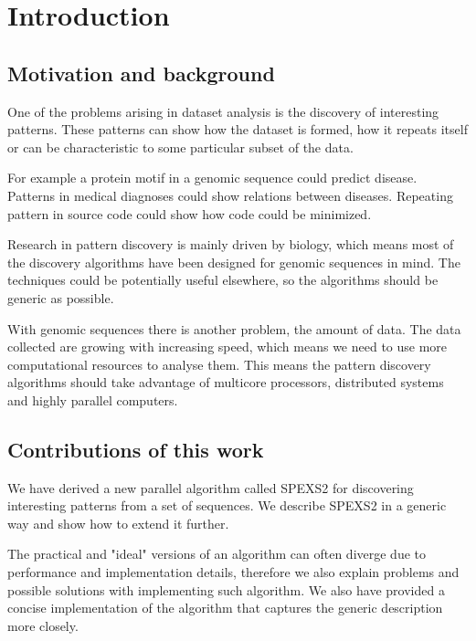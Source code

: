 \chapter{Introduction}
\label{c:introduction}


\section{Motivation and background}

One of the problems arising in dataset analysis is the discovery of interesting patterns. These patterns can show how the dataset is formed, how it repeats itself or can be characteristic to some particular subset of the data.

For example a protein motif in a genomic sequence could predict disease. Patterns in medical diagnoses could show relations between diseases. Repeating pattern in source code could show how code could be minimized. 

Research in pattern discovery is mainly driven by biology, which means most of the discovery algorithms have been designed for genomic sequences in mind. The techniques could be potentially useful elsewhere, so the algorithms should be generic as possible.

With genomic sequences there is another problem, the amount of data\cite{HowIsGenomeDoing}. The data collected are growing with increasing speed, which means we need to use more computational resources to analyse them. This means the pattern discovery algorithms should take advantage of multicore processors, distributed systems and highly parallel computers.




\section{Contributions of this work}

We have derived a new parallel algorithm called SPEXS2 for discovering interesting patterns from a set of sequences. We describe SPEXS2 in a generic way and show how to extend it further. 

The practical and "ideal" versions of an algorithm can often diverge due to performance and implementation details, therefore we also explain problems and possible solutions with implementing such algorithm. We also have provided a concise implementation of the algorithm that captures the generic description more closely.

